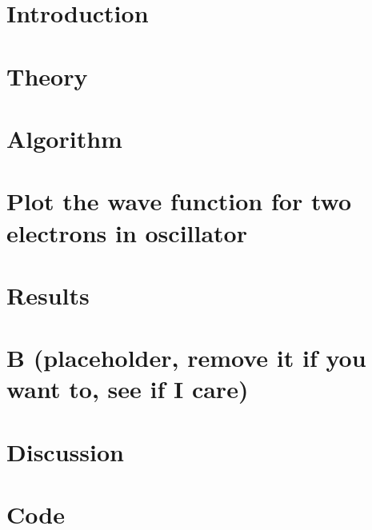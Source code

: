 \documentclass[a4paper,english]{article}
\author{Kristoffer Brækken, Vedad Hodzic, Paul Magnus
Sørensen-Clark}
\begin{document}
\begin{titlepage}
    \thispagestyle{empty}
    
\end{titlepage}

\section{Introduction}


\section{Theory}


\section{Algorithm}


\section{Plot the wave function for two electrons in oscillator}


\section{Results}




\section{B (placeholder, remove it if you want to, see if I care)}


\section{Discussion}


\section{Code}

\end{document}
